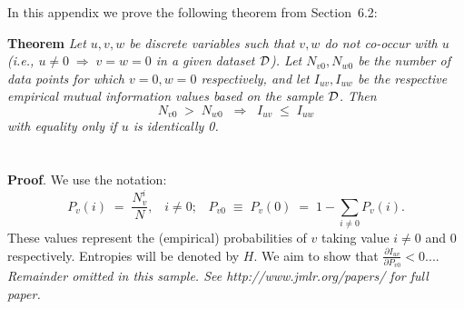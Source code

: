 \documentclass[twoside,11pt]{article}
\newcommand{\dataset}{{\cal D}}
\newcommand{\fracpartial}[2]{\ensuremath{\frac{\partial #1}{\partial #2}}}
\begin{document}


In this appendix we prove the following theorem from
Section~6.2:

\noindent
{\bf Theorem} {\it Let $u,v,w$ be discrete variables such that $v, w$ do
not co-occur with $u$ (i.e., $u\neq0\;\Rightarrow \;v=w=0$ in a given
dataset $\dataset$). Let $N_{v0},N_{w0}$ be the number of data points for
which $v=0, w=0$ respectively, and let $I_{uv},I_{uw}$ be the
respective empirical mutual information values based on the sample
$\dataset$. Then
\[
	N_{v0} \;>\; N_{w0}\;\;\Rightarrow\;\;I_{uv} \;\leq\;I_{uw}
\]
with equality only if $u$ is identically 0.} \hfill\BlackBox

\section{}

\noindent
{\bf Proof}. We use the notation:
\[
P_v(i) \;=\;\frac{N_v^i}{N},\;\;\;i \neq 0;\;\;\;
P_{v0}\;\equiv\;P_v(0)\; = \;1 - \sum_{i\neq 0}P_v(i).
\]
These values represent the (empirical) probabilities of $v$
taking value $i\neq 0$ and 0 respectively.  Entropies will be denoted
by $H$. We aim to show that $\fracpartial{I_{uv}}{P_{v0}} < 0$....\\

{\noindent \em Remainder omitted in this sample. See http://www.jmlr.org/papers/ for full paper.}


\vskip 0.2in

\end{document}
